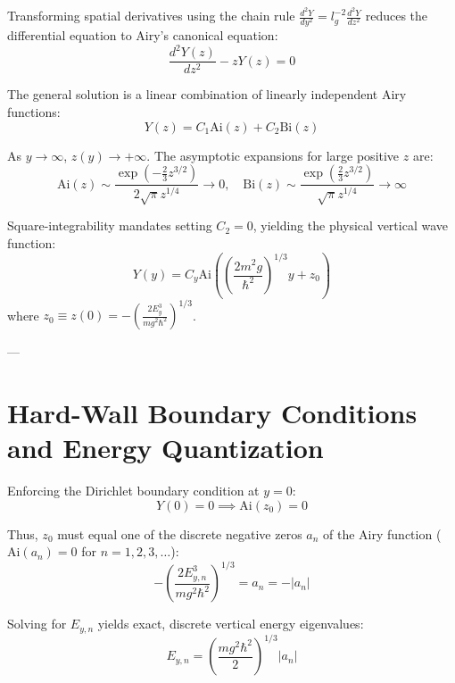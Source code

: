 \documentclass[11pt, a4paper]{article}
\begin{document}
Transforming spatial derivatives using the chain rule $\frac{d^2 Y}{dy^2} = l_g^{-2} \frac{d^2 Y}{dz^2}$ reduces the differential equation to Airy's canonical equation:
\begin{equation}
\frac{d^2 Y(z)}{dz^2} - z Y(z) = 0
\end{equation}

The general solution is a linear combination of linearly independent Airy functions:
\begin{equation}
Y(z) = C_1 \text{Ai}(z) + C_2 \text{Bi}(z)
\end{equation}

As $y \to \infty$, $z(y) \to +\infty$. The asymptotic expansions for large positive $z$ are:
\begin{equation}
\text{Ai}(z) \sim \frac{\exp\left(-\frac{2}{3} z^{3/2}\right)}{2\sqrt{\pi} z^{1/4}} \to 0, \quad \text{Bi}(z) \sim \frac{\exp\left(\frac{2}{3} z^{3/2}\right)}{\sqrt{\pi} z^{1/4}} \to \infty
\end{equation}

Square-integrability mandates setting $C_2 = 0$, yielding the physical vertical wave function:
\begin{equation}
Y(y) = C_y \text{Ai}\left( \left(\frac{2m^2 g}{\hbar^2}\right)^{1/3} y + z_0 \right)
\end{equation}
where $z_0 \equiv z(0) = -\left( \frac{2 E_y^3}{m g^2 \hbar^2} \right)^{1/3}$.

---

\section{Hard-Wall Boundary Conditions and Energy Quantization}

Enforcing the Dirichlet boundary condition at $y = 0$:
\begin{equation}
Y(0) = 0 \implies \text{Ai}(z_0) = 0
\end{equation}

Thus, $z_0$ must equal one of the discrete negative zeros $a_n$ of the Airy function ($\text{Ai}(a_n) = 0$ for $n = 1, 2, 3, \dots$):
\begin{equation}
-\left( \frac{2 E_{y,n}^3}{m g^2 \hbar^2} \right)^{1/3} = a_n = -|a_n|
\end{equation}

Solving for $E_{y,n}$ yields exact, discrete vertical energy eigenvalues:
\begin{equation}
E_{y,n} = \left( \frac{m g^2 \hbar^2}{2} \right)^{1/3} |a_n|
\end{equation}
\end{document}
